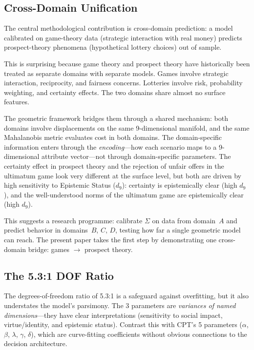 \documentclass[journal]{IEEEtran}
\begin{document}
\subsection{Cross-Domain Unification}

The central methodological contribution is cross-domain prediction: a model calibrated on game-theory data (strategic interaction with real money) predicts prospect-theory phenomena (hypothetical lottery choices) out of sample.

This is surprising because game theory and prospect theory have historically been treated as separate domains with separate models.
Games involve strategic interaction, reciprocity, and fairness concerns.
Lotteries involve risk, probability weighting, and certainty effects.
The two domains share almost no surface features.

The geometric framework bridges them through a shared mechanism: both domains involve displacements on the same 9-dimensional manifold, and the same Mahalanobis metric evaluates cost in both domains.
The domain-specific information enters through the \emph{encoding}---how each scenario maps to a 9-dimensional attribute vector---not through domain-specific parameters.
The certainty effect in prospect theory and the rejection of unfair offers in the ultimatum game look very different at the surface level, but both are driven by high sensitivity to Epistemic Status ($d_9$): certainty is epistemically clear (high $d_9$), and the well-understood norms of the ultimatum game are epistemically clear (high $d_9$).

This suggests a research programme: calibrate $\Sigma$ on data from domain~$A$ and predict behavior in domains~$B$, $C$, $D$, testing how far a single geometric model can reach.
The present paper takes the first step by demonstrating one cross-domain bridge: games $\to$ prospect theory.

\subsection{The 5.3:1 DOF Ratio}

The degrees-of-freedom ratio of 5.3:1 is a safeguard against overfitting, but it also understates the model's parsimony.
The 3 parameters are \emph{variances of named dimensions}---they have clear interpretations (sensitivity to social impact, virtue/identity, and epistemic status).
Contrast this with CPT's 5 parameters ($\alpha$, $\beta$, $\lambda$, $\gamma$, $\delta$), which are curve-fitting coefficients without obvious connections to the decision architecture.
\end{document}
